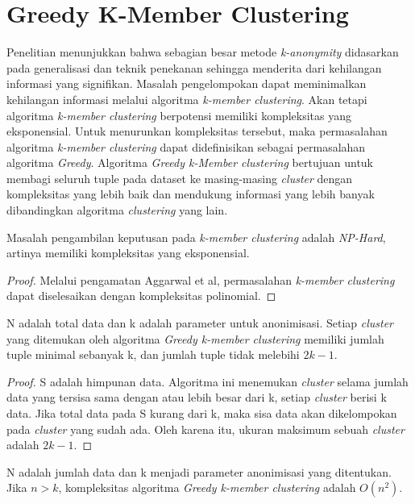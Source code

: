 \section{Greedy K-Member Clustering}
\label{sec:greedyclustering}
Penelitian menunjukkan bahwa sebagian besar metode \textit{k-anonymity} didasarkan pada generalisasi dan teknik penekanan sehingga menderita dari kehilangan informasi yang signifikan. Masalah pengelompokan dapat meminimalkan kehilangan informasi melalui algoritma \textit{k-member clustering}. Akan tetapi algoritma \textit{k-member clustering} berpotensi memiliki kompleksitas yang eksponensial. Untuk menurunkan kompleksitas tersebut, maka permasalahan algoritma \textit{k-member clustering} dapat didefinisikan sebagai permasalahan algoritma \textit{Greedy}. Algoritma \textit{Greedy k-Member clustering} bertujuan untuk membagi seluruh tuple pada dataset ke masing-masing \textit{cluster} dengan kompleksitas yang lebih baik dan mendukung informasi yang lebih banyak dibandingkan algoritma \textit{clustering} yang lain.

\begin{theorem}
Masalah pengambilan keputusan pada \textit{k-member clustering} adalah \textit{NP-Hard}, artinya memiliki kompleksitas yang eksponensial.
\end{theorem}

\begin{proof}
Melalui pengamatan Aggarwal et al, permasalahan \textit{k-member clustering} dapat diselesaikan dengan kompleksitas polinomial.
\end{proof}

\begin{theorem}
N adalah total data dan k adalah parameter untuk anonimisasi. Setiap \textit{cluster} yang ditemukan oleh algoritma \textit{Greedy k-member clustering} memiliki jumlah tuple minimal sebanyak k, dan jumlah tuple tidak melebihi $2k - 1$.
\end{theorem}

\begin{proof}
S adalah himpunan data. Algoritma ini menemukan \textit{cluster} selama jumlah data yang tersisa sama dengan atau lebih besar dari k, setiap \textit{cluster} berisi k data. Jika total data pada S kurang dari k, maka sisa data akan dikelompokan pada  \textit{cluster} yang sudah ada. Oleh karena itu, ukuran maksimum sebuah \textit{cluster} adalah $2k - 1$.
\end{proof}

\begin{theorem}
N adalah jumlah data dan k menjadi parameter anonimisasi yang ditentukan. Jika $n > k$, kompleksitas algoritma \textit{Greedy k-member clustering} adalah $O(n^2)$.
\end{theorem}

